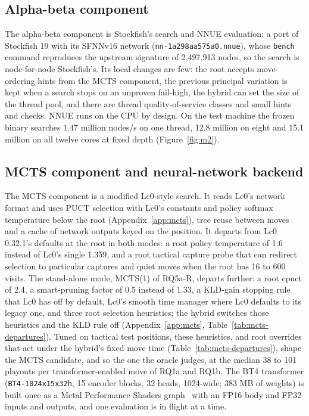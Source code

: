 \documentclass{article}
\begin{document}
\subsection{Alpha-beta component}
The alpha-beta component is Stockfish's search and NNUE evaluation: a port of Stockfish 19 with its SFNNv16 network (\texttt{nn-1a298aa575a0.nnue}), whose \texttt{bench} command reproduces the upstream signature of 2{,}497{,}913 nodes, so the search is node-for-node Stockfish's. %
Its local changes are few: the root accepts move-ordering hints from the MCTS component, the previous principal variation is kept when a search stops on an unproven fail-high, the hybrid can set the size of the thread pool, and there are thread quality-of-service classes and small hints and checks. NNUE runs on the CPU by design. On the test machine the frozen binary searches 1.47 million nodes/s on one thread, 12.8 million on eight and 15.1 million on all twelve cores at fixed depth (Figure~\ref{fig:m2}). %

\subsection{MCTS component and neural-network backend}
The MCTS component is a modified Lc0-style search. It reads Lc0's network format and uses PUCT selection with Lc0's constants and policy softmax temperature below the root (Appendix~\ref{app:mcts}), tree reuse between moves and a cache of network outputs keyed on the position. It departs from Lc0 0.32.1's defaults at the root in both modes: a root policy temperature of 1.6 instead of Lc0's single 1.359, and a root tactical capture probe that can redirect selection to particular captures and quiet moves when the root has 16 to 600 visits. The stand-alone mode, MCTS(1) of RQ5a-R, departs further: a root cpuct of 2.4, a smart-pruning factor of 0.5 instead of 1.33, a KLD-gain stopping rule that Lc0 has off by default, Lc0's smooth time manager where Lc0 defaults to its legacy one, and three root selection heuristics; the hybrid switches those heuristics and the KLD rule off (Appendix~\ref{app:mcts}, Table~\ref{tab:mcts-departures}). Tuned on tactical test positions, these heuristics, and root overrides that act under the hybrid's fixed move time (Table~\ref{tab:mcts-departures}), shape the MCTS candidate, and so the one the oracle judges, at the median 38 to 101 playouts per transformer-enabled move of RQ1a and RQ1b. The BT4 transformer (\texttt{BT4-1024x15x32h}, 15 encoder blocks, 32 heads, 1024-wide; 383 MB of weights) is built once as a Metal Performance Shaders graph~\cite{mpsgraph} with an FP16 body and FP32 inputs and outputs, and one evaluation is in flight at a time. %
\end{document}
